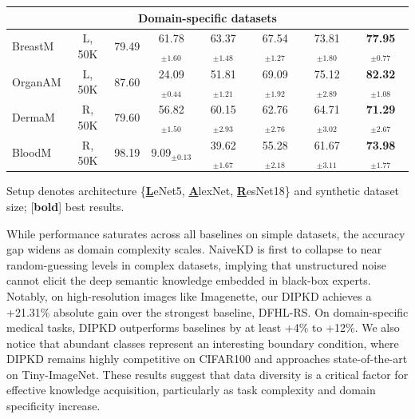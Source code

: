 \documentclass[12pt, a4paper, twoside]{book}
\numberwithin{equation}{chapter}
\theoremstyle{plain}
\theoremstyle{definition}
\theoremstyle{remark}
\newenvironment{foldable}{}{}
\begin{document}
\begin{table}[ht]
\begin{threeparttable}
\begin{tabular}{l c c c c c c c}
      \multicolumn{8}{c}{\textbf{Domain-specific datasets}} \\
      \midrule
      BreastM  & L, 50K  & 79.49 & 61.78$_{\pm 1.60}$           & 63.37$_{\pm 1.48}$           & 67.54$_{\pm 1.27}$ & 73.81$_{\pm 1.80}$          & \textbf{77.95}$_{\pm 0.77}$ \\
      OrganAM  & L, 50K  & 87.60 & 24.09$_{\pm 0.44}$           & 51.81$_{\pm 1.21}$           & 69.09$_{\pm 1.92}$ & 75.12$_{\pm 2.89}$          & \textbf{82.32}$_{\pm 1.08}$ \\
      DermaM   & R, 50K  & 79.60 & 56.82$_{\pm 1.50}$           & 60.15$_{\pm 2.93}$           & 62.76$_{\pm 2.76}$ & 64.71$_{\pm 3.02}$          & \textbf{71.29}$_{\pm 2.67}$ \\
      BloodM   & R, 50K  & 98.19 & \phantom{0}9.09$_{\pm 0.13}$ & 39.62$_{\pm 1.67}$           & 55.28$_{\pm 2.18}$ & 61.67$_{\pm 3.11}$          & \textbf{73.98}$_{\pm 1.77}$ \\
      \bottomrule
    \end{tabular}
    \begin{tablenotes}[flushleft] \footnotesize
    \item {Setup denotes architecture \{\textbf{\underline{L}}eNet5, \textbf{\underline{A}}lexNet, \textbf{\underline{R}}esNet18\} and synthetic dataset size; [\textbf{bold}] best results.}
    \end{tablenotes}
  \end{threeparttable}
\end{table}

\begin{foldable}
  While performance saturates across all baselines on simple datasets, the accuracy gap widens as domain complexity scales.
  NaiveKD is first to collapse to near random-guessing levels in complex datasets, implying that unstructured noise cannot elicit the deep semantic knowledge embedded in black-box experts.
  Notably, on high-resolution images like Imagenette, our \ac{DIPKD} achieves a +21.31\% absolute gain over the strongest baseline, DFHL-RS.
  On domain-specific medical tasks, \ac{DIPKD} outperforms baselines by at least +4\% to +12\%.
  We also notice that abundant classes represent an interesting boundary condition, where \ac{DIPKD} remains highly competitive on CIFAR100 and approaches state-of-the-art on Tiny-ImageNet.
  These results suggest that data diversity is a critical factor for effective knowledge acquisition, particularly as task complexity and domain specificity increase.
\end{foldable}
\end{document}
